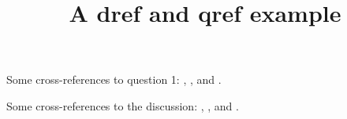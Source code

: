 \documentclass[hidesidemenu, onepage]{webquiz}
\title{A dref and qref example}
\begin{document}
\begin{discussion}\label{d:one}
    Some cross-references to question 1: ,
    ,  and .
  \end{discussion}
  \begin{question}\label{q:one}
    Some cross-references to the discussion:  ,
    ,  and .
  \end{question}
\end{document}
